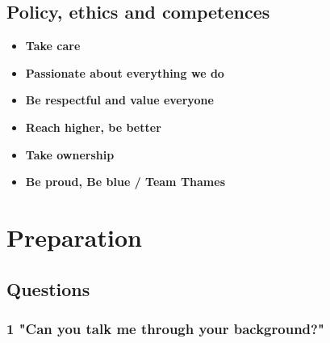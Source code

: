 \documentclass[
  letterpaper,
]{scrbook}
\providecommand{\tightlist}{%
  \setlength{\itemsep}{0pt}\setlength{\parskip}{0pt}}\usepackage{longtable,booktabs,array}
\begin{document}
\section{Policy, ethics and
competences}\label{policy-ethics-and-competences}

\begin{itemize}
\tightlist
\item
  \textbf{Take care}
\end{itemize}

\begin{itemize}
\tightlist
\item
  \textbf{Passionate about everything we do}
\end{itemize}

\begin{itemize}
\tightlist
\item
  \textbf{Be respectful and value everyone}
\end{itemize}

\begin{itemize}
\tightlist
\item
  \textbf{Reach higher, be better}
\end{itemize}

\begin{itemize}
\tightlist
\item
  \textbf{Take ownership}
\end{itemize}

\begin{itemize}
\tightlist
\item
  \textbf{Be proud, Be blue / Team Thames}
\end{itemize}


\chapter{Preparation}\label{preparation}

\section{Questions}\label{questions}

\subsection{1 "Can you talk me through your
background?"}\label{can-you-talk-me-through-your-background}
\end{document}
